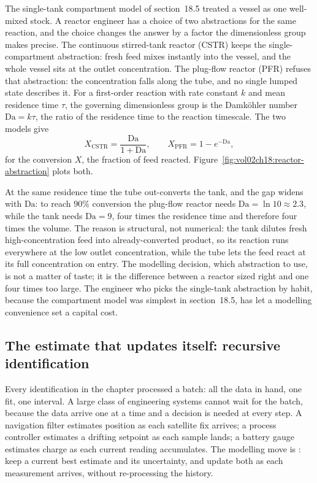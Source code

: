 The single-tank compartment model of section~18.5 treated a vessel as one
well-mixed stock. A reactor engineer has a choice of two abstractions for
the same reaction, and the choice changes the answer by a factor the
dimensionless group makes precise. The continuous stirred-tank reactor
(CSTR) keeps the single-compartment abstraction: fresh feed mixes instantly
into the vessel, and the whole vessel sits at the outlet concentration. The
plug-flow reactor (PFR) refuses that abstraction: the concentration falls
along the tube, and no single lumped state describes it. For a first-order
reaction with rate constant $k$ and mean residence time $\tau$, the
governing dimensionless group is the Damk\"ohler number $\mathrm{Da} =
k\tau$, the ratio of the residence time to the reaction timescale. The two
models give
\[
X_{\text{CSTR}} = \frac{\mathrm{Da}}{1 + \mathrm{Da}},
\qquad
X_{\text{PFR}} = 1 - e^{-\mathrm{Da}},
\]
for the conversion $X$, the fraction of feed reacted.
Figure~\ref{fig:vol02ch18:reactor-abstraction} plots both.

At the same residence time the tube out-converts the tank, and the gap
widens with $\mathrm{Da}$: to reach $90\%$ conversion the plug-flow reactor
needs $\mathrm{Da} = \ln 10 \approx 2.3$, while the tank needs
$\mathrm{Da} = 9$, four times the residence time and therefore four times
the volume. The reason is structural, not numerical: the tank dilutes fresh
high-concentration feed into already-converted product, so its reaction runs
everywhere at the low outlet concentration, while the tube lets the feed
react at its full concentration on entry. The modelling decision, which
abstraction to use, is not a matter of taste; it is the difference between a
reactor sized right and one four times too large. The engineer who picks the
single-tank abstraction by habit, because the compartment model was simplest
in section~18.5, has let a modelling convenience set a capital cost.



\subsection{The estimate that updates itself: recursive identification}

Every identification in the chapter processed a batch: all the data in hand,
one fit, one interval. A large class of engineering systems cannot wait for
the batch, because the data arrive one at a time and a decision is needed at
every step. A navigation filter estimates position as each satellite fix
arrives; a process controller estimates a drifting setpoint as each sample
lands; a battery gauge estimates charge as each current reading accumulates.
The modelling move is : keep a current best
estimate and its uncertainty, and update both as each measurement arrives,
without re-processing the history.


